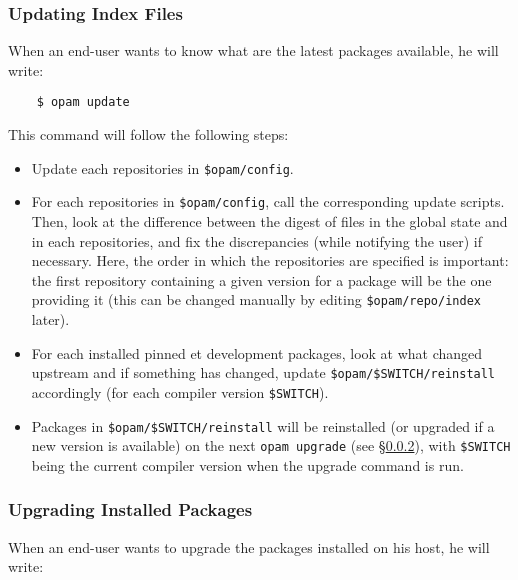 \documentclass[a4paper,10pt]{article}
\begin{document}
\subsubsection{Updating Index Files}
\label{opam-update}

When an end-user wants to know what are the latest packages available,
he will write:

\begin{verbatim}
    $ opam update
\end{verbatim}

This command will follow the following steps:

\begin{itemize}

\item Update each repositories in \verb+$opam/config+.

\item For each repositories in \verb+$opam/config+, call the
  corresponding update scripts. Then, look at the difference between
  the digest of files in the global state and in each repositories,
  and fix the discrepancies (while notifying the user) if necessary.
  Here, the order in which the repositories are specified
  is important: the first repository containing a given version for a
  package will be the one providing it (this can be changed manually
  by editing \verb+$opam/repo/index+ later).

\item For each installed pinned et development packages, look at what
  changed upstream and if something has changed, update
  \verb+$opam/$SWITCH/reinstall+ accordingly (for each compiler
  version \verb+$SWITCH+).

\item Packages in \verb+$opam/$SWITCH/reinstall+ will be reinstalled (or
  upgraded if a new version is available) on the next {\tt opam
    upgrade} (see \S\ref{opam-upgrade}), with \verb+$SWITCH+ being
  the current compiler version when the upgrade command is run.

\end{itemize}

\subsubsection{Upgrading Installed Packages}
\label{opam-upgrade}

When an end-user wants to upgrade the packages installed on his host,
he will write:
\end{document}
